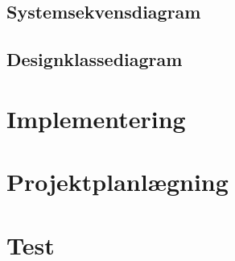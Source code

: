 \documentclass[12pt,oneside,a4paper,english]{article}
\begin{document}
\newpage
\subsection{Systemsekvensdiagram}

\newpage
\subsection{Designklassediagram}

\newpage
\section{Implementering}

\thispagestyle{fancy}

\newpage
\section{Projektplanlægning}

\thispagestyle{fancy}

\newpage
\section{Test}

\thispagestyle{fancy}

\newpage

\thispagestyle{fancy}

\label{endOfDoc}
\end{document}
